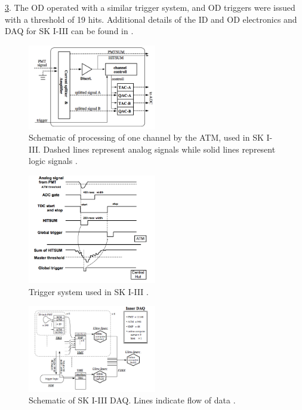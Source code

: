 \cref{fig:daq_schematic_1_3}.  The OD operated with a similar trigger system, and OD triggers were issued with a threshold of 19 hits.  Additional details of the ID and OD electronics and DAQ for SK I-III can be found in \cite{Fukuda:2002uc}. 
\begin{figure}
\centering
\includegraphics[width=0.5\textwidth]{figures/SK_1_3_ATM.png}
\caption{Schematic of processing of one channel by the ATM, used in SK I-III.  Dashed lines represent analog signals while solid lines represent logic signals \cite{Fukuda:2002uc}.}
\label{fig:daq_ATM}
\end{figure}

\begin{figure}
\centering
\includegraphics[width=0.5\textwidth]{figures/ID_trigger_SK1_3_Nishino.png}
\caption{Trigger system used in SK I-III \cite{Nishino:2009lps}.}
\label{fig:daq_trigger_1_3}
\end{figure}

\begin{figure}
\centering
\includegraphics[width=0.5\textwidth]{figures/SK_1_3_daq.png}
\caption{Schematic of SK I-III DAQ.  Lines indicate flow of data \cite{Fukuda:2002uc}.}
\label{fig:daq_schematic_1_3}
\end{figure}

